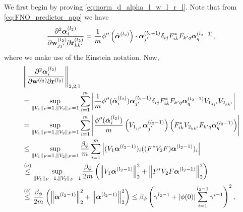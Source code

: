     \proof
    We first begin by proving \eqref{eq:norm_d_alpha_l_w_l_r_l}. Note that from \eqref{eq:FNO_predictor_app} we have
    \begin{align*}
        \frac{\partial^2 \boldsymbol{\alpha}_i^{\left(l_2\right)}}{\partial \mathbf{w}_{j j^{\prime}}^{\left(l_2\right)} \partial \mathbf{r}_{k k^{\prime}}^{\left(l_2\right)}}
        =
        \frac{1}{m} \phi^{\prime \prime}
        \left(\tilde{\boldsymbol{\alpha}}^{\left(l_2\right)}\right) \cdot \boldsymbol{\alpha}_{j^{\prime}}^{\left(l_2 - 1\right)} \delta_{i j} F_{i k}^* F_{k^{\prime} q} \boldsymbol{\alpha}_q^{\left(l_2-1\right)},
    \end{align*}
    where we make use of the Einstein notation. Now,
    \begin{align}
        \begin{aligned}
            &\left\| 
                \frac{\partial^2 \boldsymbol{\alpha}_i^{\left(l_2\right)}}{\partial \mathbf{w}^{\left(l_2\right)} \partial \mathbf{r}^{\left(l_2\right)}}
            \right\|_{2,2,1} \\
            &= 
            \sup_{\|V_1\|_F = 1, \|V_2\|_F = 1} \sum_{i=1}^m
            \left| 
                \frac{1}{m} \phi^{\prime \prime}(\tilde{\boldsymbol{\alpha}}^{(l_2)}_i) \boldsymbol{\alpha}_{j^{\prime}}^{\left(l_2 -1\right)} \delta_{i j} F_{i k}^* F_{k^{\prime} q} \boldsymbol{\alpha}_q^{\left(l_2-1\right)} V_{1_{j j^{\prime}}} V_{2_{k k^{\prime}}} 
            \right| \\ 
            &= 
            \sup_{\|V_1\|_F = 1, \|V_2\|_F = 1}\sum_{i=1}^m
            \left| 
            \frac{\phi^{\prime \prime}(\tilde{\boldsymbol{\alpha}}^{(l_2)}_i)}{m}
            \left(
                V_{1_{ij^{\prime}}} \boldsymbol{\alpha}^{(l_2 - 1)}_{j^{'}}
            \right) 
            \left(
                F_{i k}^* V_{2_{k k^{\prime}}} F_{k^{\prime} q} \boldsymbol{\alpha}_q^{\left(l_2{-1}\right)}\right)
            \right| \\
            &\leq
            \sup_{\|V_1\|_F = 1, \|V_2\|_F = 1}
            \frac{\beta_\phi}{m}
            \sum^m_{i=1}
            \left| 
            (V_1 \boldsymbol{\alpha}^{(l_2-1)})_i((F^*V_2F)\boldsymbol{\alpha}^{(l_2-1)})_i      \right| 
            \\
            &\overset{(a)}{\leq}
            \sup_{\|V_1\|_F = 1, \|V_2\|_F = 1}
            \frac{\beta_{\phi}}{2m} \left(\left\|V_1 \boldsymbol{\alpha}^{\left(l_2 - 1\right)}\right\|_2^2+\left\|F^* V_2 F \boldsymbol{\alpha}^{(l_2-1)}\right\|_2^2\right) \\
            &\overset{(b)}{\leq}
            \frac{\beta_{\phi}}{2m}\left(\left\|\boldsymbol{\alpha}^{\left(l_2 - 1\right)}\right\|_2^2+\left\|\boldsymbol{\alpha}^{\left(l_2-1\right)}\right\|_2^2\right) \leq \beta_{\phi}
                \left(\gamma^{l_2-1}+|\phi(0)| \sum_{i=1}^{l_2-1} \gamma^{i-1}\right)^2,
        \end{aligned}
    \end{align}
